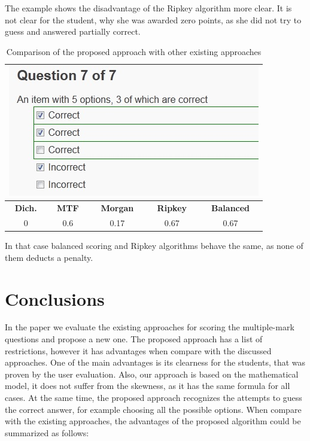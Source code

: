 \begin{example}
The example shows the disadvantage of the Ripkey algorithm more clear.
It is not clear for the student, why she was awarded zero points, as she did not try to guess and answered partially correct.
\end{example}

\begin{table}[h!]
	\centering
	\begin{tabularx}{0.5\columnwidth}{c c c c c}    
    \toprule
    \multicolumn{5}{c}{\includegraphics[width=0.5\columnwidth]{images/case7.jpg}}\\
    \midrule
    \textbf{Dich.}&\textbf{MTF}&\textbf{Morgan}&\textbf{Ripkey}&\textbf{Balanced}\\
	\midrule
    0&0.6&0.17&0.67&0.67\\
	\bottomrule
    \end{tabularx}
	\caption{Comparison of the proposed approach with other existing approaches}
	\label{tab:case 7}
\end{table}

\begin{example}
In that case balanced scoring and Ripkey algorithms behave the same, as none of them deducts a penalty.
\end{example}

\section{Conclusions}
\label{sec:conclusions}

In the paper we evaluate the existing approaches for scoring the multiple-mark questions and propose a new one.
The proposed approach has a list of restrictions, however it has advantages when compare with the discussed approaches.
One of the main advantages is its clearness for the students, that was proven by the user evaluation.
Also, our approach is based on the mathematical model, it does not suffer from the skewness, as it has the same formula for all cases.
At the same time, the proposed approach recognizes the attempts to guess the correct answer, for example choosing all the possible options.
When compare with the existing approaches, the advantages of the proposed algorithm could be summarized as follows:

